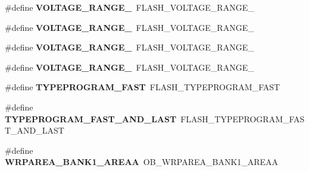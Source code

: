 \begin{DoxyCompactItemize}
\item 
\hypertarget{group___h_a_l___f_l_a_s_h___aliased___defines_ga5a1b1ceafccd5ab37c7cfbebc9527329}{\#define {\bfseries V\-O\-L\-T\-A\-G\-E\-\_\-\-R\-A\-N\-G\-E\-\_}~F\-L\-A\-S\-H\-\_\-\-V\-O\-L\-T\-A\-G\-E\-\_\-\-R\-A\-N\-G\-E\-\_}\label{group___h_a_l___f_l_a_s_h___aliased___defines_ga5a1b1ceafccd5ab37c7cfbebc9527329}

\item 
\hypertarget{group___h_a_l___f_l_a_s_h___aliased___defines_ga1c0639cea187d17c4dad607fe124a94f}{\#define {\bfseries V\-O\-L\-T\-A\-G\-E\-\_\-\-R\-A\-N\-G\-E\-\_}~F\-L\-A\-S\-H\-\_\-\-V\-O\-L\-T\-A\-G\-E\-\_\-\-R\-A\-N\-G\-E\-\_}\label{group___h_a_l___f_l_a_s_h___aliased___defines_ga1c0639cea187d17c4dad607fe124a94f}

\item 
\hypertarget{group___h_a_l___f_l_a_s_h___aliased___defines_ga45c6cc06a75f9dfd18e3d182cbe1387b}{\#define {\bfseries V\-O\-L\-T\-A\-G\-E\-\_\-\-R\-A\-N\-G\-E\-\_}~F\-L\-A\-S\-H\-\_\-\-V\-O\-L\-T\-A\-G\-E\-\_\-\-R\-A\-N\-G\-E\-\_}\label{group___h_a_l___f_l_a_s_h___aliased___defines_ga45c6cc06a75f9dfd18e3d182cbe1387b}

\item 
\hypertarget{group___h_a_l___f_l_a_s_h___aliased___defines_ga98497e19f090f03d71a1537fbcfebfe9}{\#define {\bfseries V\-O\-L\-T\-A\-G\-E\-\_\-\-R\-A\-N\-G\-E\-\_}~F\-L\-A\-S\-H\-\_\-\-V\-O\-L\-T\-A\-G\-E\-\_\-\-R\-A\-N\-G\-E\-\_}\label{group___h_a_l___f_l_a_s_h___aliased___defines_ga98497e19f090f03d71a1537fbcfebfe9}

\item 
\hypertarget{group___h_a_l___f_l_a_s_h___aliased___defines_gae3b03b62939464528d8a52b034135ea2}{\#define {\bfseries T\-Y\-P\-E\-P\-R\-O\-G\-R\-A\-M\-\_\-\-F\-A\-S\-T}~F\-L\-A\-S\-H\-\_\-\-T\-Y\-P\-E\-P\-R\-O\-G\-R\-A\-M\-\_\-\-F\-A\-S\-T}\label{group___h_a_l___f_l_a_s_h___aliased___defines_gae3b03b62939464528d8a52b034135ea2}

\item 
\hypertarget{group___h_a_l___f_l_a_s_h___aliased___defines_gab52dbb436e471071f4700f9bafcb0cef}{\#define {\bfseries T\-Y\-P\-E\-P\-R\-O\-G\-R\-A\-M\-\_\-\-F\-A\-S\-T\-\_\-\-A\-N\-D\-\_\-\-L\-A\-S\-T}~F\-L\-A\-S\-H\-\_\-\-T\-Y\-P\-E\-P\-R\-O\-G\-R\-A\-M\-\_\-\-F\-A\-S\-T\-\_\-\-A\-N\-D\-\_\-\-L\-A\-S\-T}\label{group___h_a_l___f_l_a_s_h___aliased___defines_gab52dbb436e471071f4700f9bafcb0cef}

\item 
\hypertarget{group___h_a_l___f_l_a_s_h___aliased___defines_ga4d57e7a32711f223077cc45a55b4d333}{\#define {\bfseries W\-R\-P\-A\-R\-E\-A\-\_\-\-B\-A\-N\-K1\-\_\-\-A\-R\-E\-A\-A}~O\-B\-\_\-\-W\-R\-P\-A\-R\-E\-A\-\_\-\-B\-A\-N\-K1\-\_\-\-A\-R\-E\-A\-A}\label{group___h_a_l___f_l_a_s_h___aliased___defines_ga4d57e7a32711f223077cc45a55b4d333}


\end{DoxyCompactItemize}
